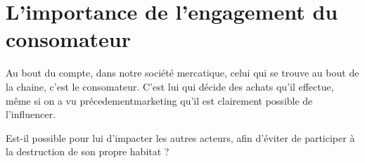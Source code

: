 \section{L'importance de l'engagement du consomateur}

\smallbreak Au bout du compte, dans notre société mercatique, celui qui se trouve au bout de la chaine, c'est le consomateur.
C'est lui qui décide des achats qu'il effectue, même si on a vu précedement{marketing} qu'il est clairement possible de l'influencer.

Est-il possible pour lui d'impacter les autres acteurs, afin d'éviter de participer à la destruction de son propre habitat ?
